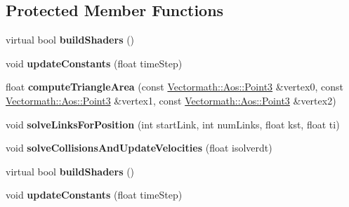 \subsection*{Protected Member Functions}
\begin{DoxyCompactItemize}
\item 
\mbox{\label{classbtOpenCLSoftBodySolverSIMDAware_aa8ee9bc875c146d057dbec97a265f28d}} 
virtual bool {\bfseries build\+Shaders} ()
\item 
\mbox{\label{classbtOpenCLSoftBodySolverSIMDAware_ac6d30fe05474179503e358206b324f4a}} 
void {\bfseries update\+Constants} (float time\+Step)
\item 
\mbox{\label{classbtOpenCLSoftBodySolverSIMDAware_ab79b13b9647a6c39ec688a6ed64f80b3}} 
float {\bfseries compute\+Triangle\+Area} (const \hyperlink{classVectormath_1_1Aos_1_1Point3}{Vectormath\+::\+Aos\+::\+Point3} \&vertex0, const \hyperlink{classVectormath_1_1Aos_1_1Point3}{Vectormath\+::\+Aos\+::\+Point3} \&vertex1, const \hyperlink{classVectormath_1_1Aos_1_1Point3}{Vectormath\+::\+Aos\+::\+Point3} \&vertex2)
\item 
\mbox{\label{classbtOpenCLSoftBodySolverSIMDAware_a08067324c12be8a65f8e04e222e2a0c3}} 
void {\bfseries solve\+Links\+For\+Position} (int start\+Link, int num\+Links, float kst, float ti)
\item 
\mbox{\label{classbtOpenCLSoftBodySolverSIMDAware_a8dbb149d1a9e3e836b63ab5682bf1a3c}} 
void {\bfseries solve\+Collisions\+And\+Update\+Velocities} (float isolverdt)
\item 
\mbox{\label{classbtOpenCLSoftBodySolverSIMDAware_a804fa954c49622cb66a38b8c513978fb}} 
virtual bool {\bfseries build\+Shaders} ()
\item 
\mbox{\label{classbtOpenCLSoftBodySolverSIMDAware_ac6d30fe05474179503e358206b324f4a}} 
void {\bfseries update\+Constants} (float time\+Step)
\item 
\mbox{\label{classbtOpenCLSoftBodySolverSIMDAware_ab79b13b9647a6c39ec688a6ed64f80b3}} 

\end{DoxyCompactItemize}
